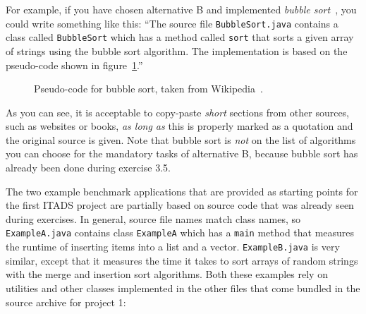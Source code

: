 \documentclass[a4paper,10pt]{article}
\begin{document}
For example, if you have chosen alternative B and implemented \emph{bubble sort}~\cite{wikipedia:bubble-sort}, you could write something like this:
``The source file \texttt{BubbleSort.java} contains a class called \texttt{BubbleSort} which has a method called \texttt{sort} that sorts a given array of strings using the bubble sort algorithm.
The implementation is based on the pseudo-code shown in figure~\ref{fig:bubble-sort}.''

\begin{figure}
  \centering
  \caption{
    Pseudo-code for bubble sort, taken from Wikipedia~\cite{wikipedia:bubble-sort}.
  }\label{fig:bubble-sort}
\end{figure}

As you can see, it is acceptable to copy-paste \emph{short} sections from other sources, such as websites or books, \emph{as long as} this is properly marked as a quotation and the original source is given.
Note that bubble sort is \emph{not} on the list of algorithms you can choose for the mandatory tasks of alternative B, because bubble sort has already been done during exercise 3.5.

The two example benchmark applications that are provided as starting points for the first ITADS project are partially based on source code that was already seen during exercises.
In general, source file names match class names, so \texttt{ExampleA.java} contains class \texttt{ExampleA} which has a \texttt{main} method that measures the runtime of inserting items into a list and a vector.
\texttt{ExampleB.java} is very similar, except that it measures the time it takes to sort arrays of random strings with the merge and insertion sort algorithms.
Both these examples rely on utilities and other classes implemented in the other files that come bundled in the source archive for project 1:
\end{document}

